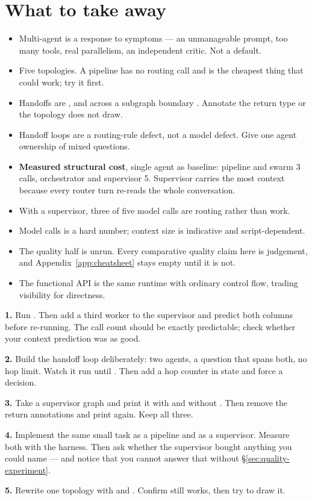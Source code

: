 \section{What to take away}
\label{sec:ch11-summary}

\begin{itemize}[leftmargin=1.4em]
\item Multi-agent is a response to symptoms --- an unmanageable prompt, too many
      tools, real parallelism, an independent critic. Not a default.
\item Five topologies. A pipeline has no routing call and is the cheapest thing
      that could work; try it first.
\item Handoffs are , and across a subgraph boundary
      . Annotate the return type or the topology does not
      draw.
\item Handoff loops are a routing-rule defect, not a model defect. Give one agent
      ownership of mixed questions.
\item \textbf{Measured structural cost}, single agent as baseline: pipeline and
      swarm 3 calls, orchestrator and supervisor 5. Supervisor carries the most
      context because every router turn re-reads the whole conversation.
\item With a supervisor, three of five model calls are routing rather than work.
\item Model calls is a hard number; context size is indicative and
      script-dependent.
\item The quality half is unrun. Every comparative quality claim here is
      judgement, and Appendix~\ref{app:cheatsheet} stays empty until it is not.
\item The functional API is the same  runtime with ordinary control
      flow, trading visibility for directness.
\end{itemize}

\begin{exercisebox}
\textbf{1.} Run . Then add a third worker to
the supervisor and predict both columns before re-running. The call count should
be exactly predictable; check whether your context prediction was as good.

\textbf{2.} Build the handoff loop deliberately: two agents, a question that
spans both, no hop limit. Watch it run until . Then add
a hop counter in state and force a decision.

\textbf{3.} Take a supervisor graph and print it with and without
. Then remove the  return annotations and print
again. Keep all three.

\textbf{4.} Implement the same small task as a pipeline and as a supervisor.
Measure both with the harness. Then ask whether the supervisor bought anything
you could name --- and notice that you cannot answer that without
\S\ref{sec:quality-experiment}.

\textbf{5.} Rewrite one topology with  and . Confirm
 still works, then try to draw it.
\end{exercisebox}

